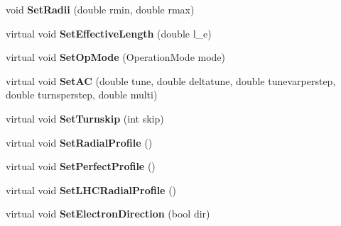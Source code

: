 \begin{DoxyCompactItemize}
void {\bfseries Set\+Radii} (double rmin, double rmax)
\item 
\mbox{\label{classHollowElectronLens_a91fd03e26c34f7cd4fd3fbef963ec687}} 
virtual void {\bfseries Set\+Effective\+Length} (double l\+\_\+e)
\item 
\mbox{\label{classHollowElectronLens_a8287eeb02310b2c99b99416773940b81}} 
virtual void {\bfseries Set\+Op\+Mode} (Operation\+Mode mode)
\item 
\mbox{\label{classHollowElectronLens_a2902249e6cceb7747659d38091a05f40}} 
virtual void {\bfseries Set\+AC} (double tune, double deltatune, double tunevarperstep, double turnsperstep, double multi)
\item 
\mbox{\label{classHollowElectronLens_aa237a87757030d437c35e9c32b5e67a7}} 
virtual void {\bfseries Set\+Turnskip} (int skip)
\item 
\mbox{\label{classHollowElectronLens_a89069800c53cda326c0581cf8e8d5ea3}} 
virtual void {\bfseries Set\+Radial\+Profile} ()
\item 
\mbox{\label{classHollowElectronLens_ae7477b99bdeda3fa7cdcd6238e44ceb0}} 
virtual void {\bfseries Set\+Perfect\+Profile} ()
\item 
\mbox{\label{classHollowElectronLens_a1335e4c66375e38333f946899c6fa35f}} 
virtual void {\bfseries Set\+L\+H\+C\+Radial\+Profile} ()
\item 
\mbox{\label{classHollowElectronLens_a0856ff105f65c9adbdc6fe602975f0c2}} 
virtual void {\bfseries Set\+Electron\+Direction} (bool dir)
\end{DoxyCompactItemize}

